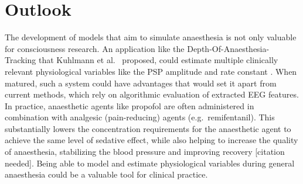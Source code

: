 \section{Outlook}

The development of models that aim to simulate anaesthesia is not only valuable for consciousness research.
An application like the Depth-Of-Anaesthesia-Tracking that Kuhlmann et al.~\cite{kuhlmann_neural_2016} proposed,
could estimate multiple clinically relevant physiological variables like the PSP amplitude and rate constant
.
When matured, such a system could have advantages that would set it apart from current methods,
which rely on algorithmic evaluation of extracted EEG features.
In practice, anaesthetic agents like propofol are often administered in combination with analgesic (pain-reducing)
agents (e.g.\ remifentanil).
This substantially lowers the concentration requirements for the anaesthetic agent to achieve the same level of
sedative effect,
while also helping to increase the quality of anaesthesia, stabilizing the blood pressure and improving recovery
[citation needed].
Being able to model and estimate physiological variables during general anaesthesia
could be a valuable tool for clinical practice.